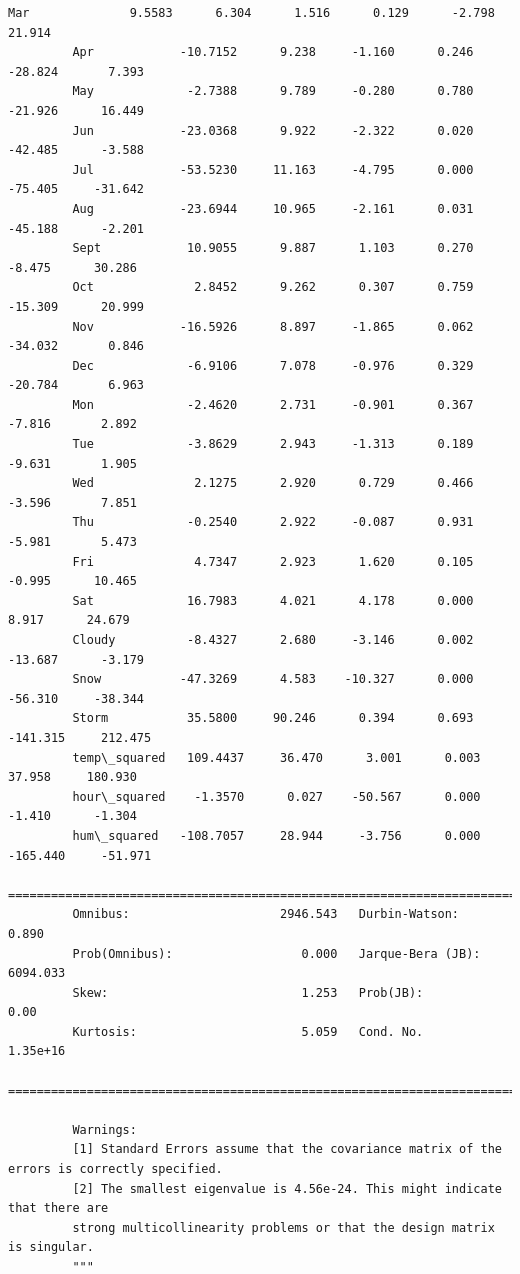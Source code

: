 \documentclass[11pt]{article}
\begin{document}
\begin{Verbatim}[commandchars=\\\{\}]
         Mar              9.5583      6.304      1.516      0.129      -2.798      21.914
         Apr            -10.7152      9.238     -1.160      0.246     -28.824       7.393
         May             -2.7388      9.789     -0.280      0.780     -21.926      16.449
         Jun            -23.0368      9.922     -2.322      0.020     -42.485      -3.588
         Jul            -53.5230     11.163     -4.795      0.000     -75.405     -31.642
         Aug            -23.6944     10.965     -2.161      0.031     -45.188      -2.201
         Sept            10.9055      9.887      1.103      0.270      -8.475      30.286
         Oct              2.8452      9.262      0.307      0.759     -15.309      20.999
         Nov            -16.5926      8.897     -1.865      0.062     -34.032       0.846
         Dec             -6.9106      7.078     -0.976      0.329     -20.784       6.963
         Mon             -2.4620      2.731     -0.901      0.367      -7.816       2.892
         Tue             -3.8629      2.943     -1.313      0.189      -9.631       1.905
         Wed              2.1275      2.920      0.729      0.466      -3.596       7.851
         Thu             -0.2540      2.922     -0.087      0.931      -5.981       5.473
         Fri              4.7347      2.923      1.620      0.105      -0.995      10.465
         Sat             16.7983      4.021      4.178      0.000       8.917      24.679
         Cloudy          -8.4327      2.680     -3.146      0.002     -13.687      -3.179
         Snow           -47.3269      4.583    -10.327      0.000     -56.310     -38.344
         Storm           35.5800     90.246      0.394      0.693    -141.315     212.475
         temp\_squared   109.4437     36.470      3.001      0.003      37.958     180.930
         hour\_squared    -1.3570      0.027    -50.567      0.000      -1.410      -1.304
         hum\_squared   -108.7057     28.944     -3.756      0.000    -165.440     -51.971
         ==============================================================================
         Omnibus:                     2946.543   Durbin-Watson:                   0.890
         Prob(Omnibus):                  0.000   Jarque-Bera (JB):             6094.033
         Skew:                           1.253   Prob(JB):                         0.00
         Kurtosis:                       5.059   Cond. No.                     1.35e+16
         ==============================================================================
         
         Warnings:
         [1] Standard Errors assume that the covariance matrix of the errors is correctly specified.
         [2] The smallest eigenvalue is 4.56e-24. This might indicate that there are
         strong multicollinearity problems or that the design matrix is singular.
         """
\end{Verbatim}
            
\end{document}

